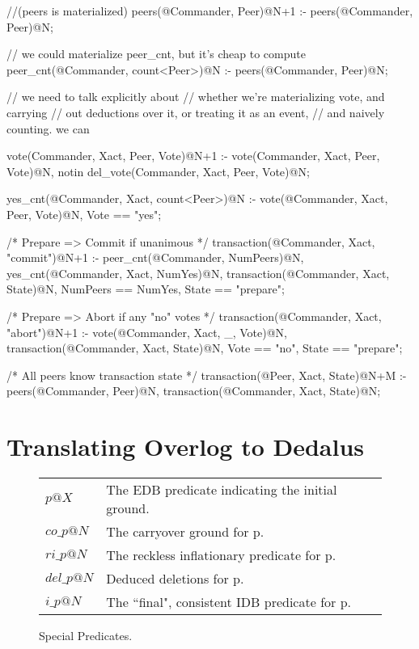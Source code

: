 \begin{Dedalus}
\small
//(peers is materialized)
peers(@Commander, Peer)@N+1 :-
    peers(@Commander, Peer)@N;

// we could materialize peer_cnt, but it's 
cheap to compute
peer_cnt(@Commander, count<Peer>)@N :-
  peers(@Commander, Peer)@N;

// we need to talk explicitly about 
// whether we're materializing vote, and carrying 
// out deductions over it, or treating it as an event, 
// and naively counting.  we can 

vote(Commander, Xact, Peer, Vote)@N+1 :-
    vote(Commander, Xact, Peer, Vote)@N,
    notin del_vote(Commander, Xact, Peer, Vote)@N;

yes_cnt(@Commander, Xact, count<Peer>)@N :-
  vote(@Commander, Xact, Peer, Vote)@N,
  Vote == "yes";

/* Prepare => Commit if unanimous */
transaction(@Commander, Xact, "commit")@N+1 :-
  peer_cnt(@Commander, NumPeers)@N,
  yes_cnt(@Commander, Xact, NumYes)@N,
  transaction(@Commander, Xact, State)@N,
  NumPeers == NumYes, State == "prepare";

/* Prepare => Abort if any "no" votes */
transaction(@Commander, Xact, "abort")@N+1 :-
  vote(@Commander, Xact, _, Vote)@N,
  transaction(@Commander, Xact, State)@N,
  Vote == "no", State == "prepare";

/* All peers know transaction state */
transaction(@Peer, Xact, State)@N+M :-
  peers(@Commander, Peer)@N,
  transaction(@Commander, Xact, State)@N;
\end{Dedalus}

\section{Translating Overlog to Dedalus}

\begin{figure}[t]
\begin{tabular}{ll} \hline
$p@X$ & The EDB predicate indicating the initial ground. \\
$co\_p@N$ & The carryover ground for p. \\
$ri\_p@N$ & The reckless inflationary predicate for p. \\
$del\_p@N$ & Deduced deletions for p. \\
$i\_p@N$ & The ``final", consistent IDB predicate for p. \\ \hline
\end{tabular}
\caption{Special Predicates.}
\label{fig:overlogtab}
\end{figure}


